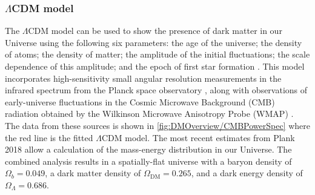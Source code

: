 \subsubsection{$\Lambda$CDM model}\label{sec:DMOverview/LambdaCDM}
The $\Lambda \text{CDM}$ model can be used to show the presence of dark matter in our Universe using the following six parameters: the age of the universe; the density of atoms; the density of matter; the amplitude of the initial fluctuations; the scale dependence of this amplitude; and the epoch of first star formation \cite{LCDMparam}. This model incorporates high-sensitivity small angular resolution measurements in the infrared spectrum from the Planck space observatory \cite{2013Planck}, along with observations of early-universe fluctuations in the Cosmic Microwave Background (CMB) radiation obtained by the Wilkinson Microwave Anisotropy Probe (WMAP) \cite{WMAP}. The data from these sources is shown in \autoref{fig:DMOverview/CMBPowerSpec} where the red line is the fitted $\Lambda \text{CDM}$ model. The most recent estimates from Plank 2018 allow a calculation of the mass-energy distribution in our Universe. The combined analysis results in a spatially-flat universe with a baryon density of $\Omega_{b}=0.049$, a dark matter density of $\Omega_{\text{DM}}=0.265$, and a dark energy density of $\Omega_{\Lambda}=0.686$.

